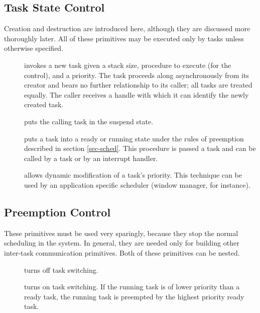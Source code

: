 \subsection{Task State Control}
\label{sec-ctrl}
Creation and destruction are introduced here, although they are discussed
more thoroughly later.  All of these primitives may be executed only
by tasks unless otherwise specified.
\begin{description}
\item[]
    invokes a new task given a stack size, procedure to execute (for the
    control), and a priority.  The task proceeds along asynchronously from
    its creator and bears no further relationship to its caller; 
    all tasks are treated equally.  The caller receives a handle with which
    it can identify the newly created task.
\item[]
    puts the calling task in the suspend state.
\item[]
    puts a task into a ready or running state under the rules of preemption
    described in section \ref{sec-sched}.  
    This procedure is passed a task and can be called by
    a task or by an interrupt handler.
\item[]
    allows dynamic modification of a task's priority.  This technique can
    be used by an application specific scheduler (window manager, for 
    instance).
\end{description}

\subsection{Preemption Control}
These primitives must be used very sparingly, because they stop
the normal scheduling in the system.  In general, they are needed only
for building other inter-task communication primitives.  Both of 
these primitives can be nested.
\begin{description}
\item[]
    turns off task switching.
\item[]
    turns on task switching.
    If the running task is of lower priority than a ready task, 
    the running task is preempted by the highest priority ready task.
\end{description}

